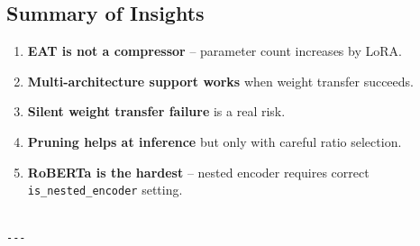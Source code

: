 \subsection{Summary of Insights}

\begin{enumerate}
\item \textbf{EAT is not a compressor} -- parameter count increases by LoRA.
\item \textbf{Multi-architecture support works} when weight transfer succeeds.
\item \textbf{Silent weight transfer failure} is a real risk.
\item \textbf{Pruning helps at inference} but only with careful ratio selection.
\item \textbf{RoBERTa is the hardest} -- nested encoder requires correct
  \texttt{is\_nested\_encoder} setting.
\end{enumerate}
\begin{lstlisting}

---
\end{lstlisting}